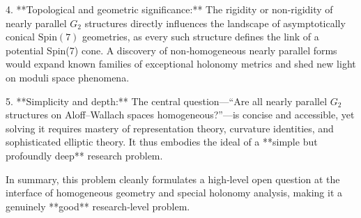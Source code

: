 4. **Topological and geometric significance:**  
   The rigidity or non-rigidity of nearly parallel \(G_2\) structures directly influences the landscape of asymptotically conical \(\mathrm{Spin}(7)\) geometries, as every such structure defines the link of a potential Spin(7) cone. A discovery of non‑homogeneous nearly parallel forms would expand known families of exceptional holonomy metrics and shed new light on moduli space phenomena.

5. **Simplicity and depth:**  
   The central question—“Are all nearly parallel \(G_2\) structures on Aloff–Wallach spaces homogeneous?”—is concise and accessible, yet solving it requires mastery of representation theory, curvature identities, and sophisticated elliptic theory. It thus embodies the ideal of a **simple but profoundly deep** research problem.

In summary, this problem cleanly formulates a high‑level open question at the interface of homogeneous geometry and special holonomy analysis, making it a genuinely **good** research‑level problem.